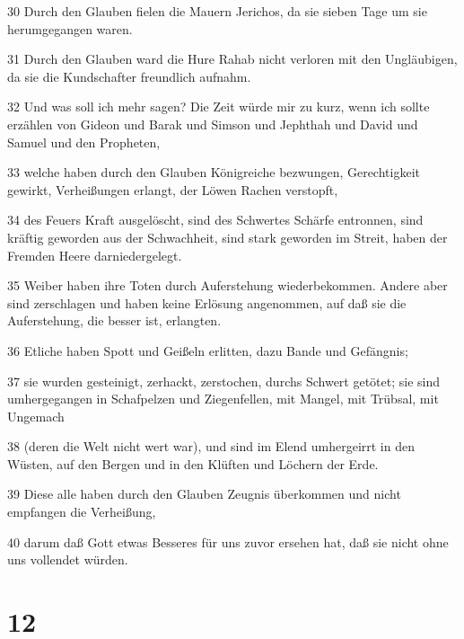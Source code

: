 \par 30 Durch den Glauben fielen die Mauern Jerichos, da sie sieben Tage um sie herumgegangen waren.
\par 31 Durch den Glauben ward die Hure Rahab nicht verloren mit den Ungläubigen, da sie die Kundschafter freundlich aufnahm.
\par 32 Und was soll ich mehr sagen? Die Zeit würde mir zu kurz, wenn ich sollte erzählen von Gideon und Barak und Simson und Jephthah und David und Samuel und den Propheten,
\par 33 welche haben durch den Glauben Königreiche bezwungen, Gerechtigkeit gewirkt, Verheißungen erlangt, der Löwen Rachen verstopft,
\par 34 des Feuers Kraft ausgelöscht, sind des Schwertes Schärfe entronnen, sind kräftig geworden aus der Schwachheit, sind stark geworden im Streit, haben der Fremden Heere darniedergelegt.
\par 35 Weiber haben ihre Toten durch Auferstehung wiederbekommen. Andere aber sind zerschlagen und haben keine Erlösung angenommen, auf daß sie die Auferstehung, die besser ist, erlangten.
\par 36 Etliche haben Spott und Geißeln erlitten, dazu Bande und Gefängnis;
\par 37 sie wurden gesteinigt, zerhackt, zerstochen, durchs Schwert getötet; sie sind umhergegangen in Schafpelzen und Ziegenfellen, mit Mangel, mit Trübsal, mit Ungemach
\par 38 (deren die Welt nicht wert war), und sind im Elend umhergeirrt in den Wüsten, auf den Bergen und in den Klüften und Löchern der Erde.
\par 39 Diese alle haben durch den Glauben Zeugnis überkommen und nicht empfangen die Verheißung,
\par 40 darum daß Gott etwas Besseres für uns zuvor ersehen hat, daß sie nicht ohne uns vollendet würden.

\chapter{12}

